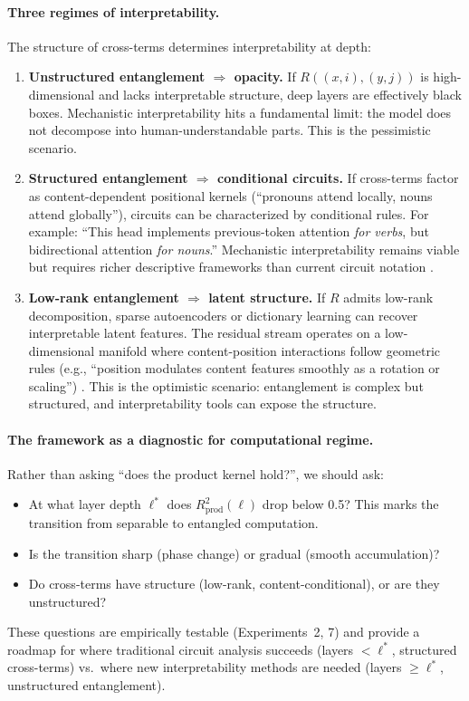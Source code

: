 \documentclass[11pt]{article}
\theoremstyle{definition}
\begin{document}
\paragraph{Three regimes of interpretability.}
The structure of cross-terms determines interpretability at depth:

\begin{enumerate}
    \item \textbf{Unstructured entanglement $\Rightarrow$ opacity.} If $R((x,i),(y,j))$ is high-dimensional and lacks interpretable structure, deep layers are effectively black boxes. Mechanistic interpretability hits a fundamental limit: the model does not decompose into human-understandable parts. This is the pessimistic scenario.

    \item \textbf{Structured entanglement $\Rightarrow$ conditional circuits.} If cross-terms factor as content-dependent positional kernels (``pronouns attend locally, nouns attend globally''), circuits can be characterized by conditional rules. For example: ``This head implements previous-token attention \emph{for verbs}, but bidirectional attention \emph{for nouns}.'' Mechanistic interpretability remains viable but requires richer descriptive frameworks than current circuit notation \cite{wang2023interpretability,olsson2022induction}.

    \item \textbf{Low-rank entanglement $\Rightarrow$ latent structure.} If $R$ admits low-rank decomposition, sparse autoencoders \cite{bricken2023monosemanticity,templeton2024sae} or dictionary learning \cite{cunningham2024dictlearning} can recover interpretable latent features. The residual stream operates on a low-dimensional manifold where content-position interactions follow geometric rules (e.g., ``position modulates content features smoothly as a rotation or scaling'') \cite{park2024geometry}. This is the optimistic scenario: entanglement is complex but structured, and interpretability tools can expose the structure.
\end{enumerate}

\paragraph{The framework as a diagnostic for computational regime.}
Rather than asking ``does the product kernel hold?'', we should ask:
\begin{itemize}
    \item At what layer depth $\ell^*$ does $R^2_{\text{prod}}(\ell)$ drop below 0.5? This marks the transition from separable to entangled computation.
    \item Is the transition sharp (phase change) or gradual (smooth accumulation)?
    \item Do cross-terms have structure (low-rank, content-conditional), or are they unstructured?
\end{itemize}
These questions are empirically testable (Experiments~2, 7) and provide a roadmap for where traditional circuit analysis succeeds (layers $< \ell^*$, structured cross-terms) vs.\ where new interpretability methods are needed (layers $\geq \ell^*$, unstructured entanglement).
\end{document}
